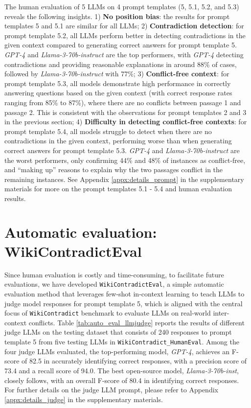 \documentclass{article}
\begin{document}
The human evaluation of 5 LLMs on 4 prompt templates (5, 5.1, 5.2, and 5.3) reveals the following insights. 
1) \textbf{No position bias}: the results for prompt templates 5 and 5.1 are similar for all LLMs;
2) \textbf{Contradiction detection}: for prompt template 5.2, all LLMs perform better in detecting contradictions in the given context compared to generating correct answers for prompt template 5. \emph{GPT-4} and \emph{Llama-3-70b-instruct} are the top performers, with \emph{GPT-4} detecting contradictions and providing reasonable explanations in around 88\% of cases, followed by \emph{Llama-3-70b-instruct} with 77\%;
3) \textbf{Conflict-free context}: for prompt template 5.3, all models demonstrate high performance in correctly answering questions based on the given context (with correct response rates ranging from 85\% to 87\%), where there are no conflicts between passage 1 and passage 2. This is consistent with the observations for prompt templates 2 and 3 in the previous section;
4) \textbf{Difficulty in detecting conflict-free contexts}: for prompt template 5.4, all models struggle to detect when there are no contradictions in the given context, performing worse than when generating correct answers for prompt template 5.3. \emph{GPT-4} and \emph{Llama-3-70b-instruct} are the worst performers, only confirming 44\% and 48\% of instances as conflict-free, and ``making up'' reasons to explain why the two passages conflict in the remaining instances. See Appendix \ref{appx:details_prompt} in the supplementary materials for more on the prompt templates 5.1 - 5.4 and human evaluation results.








\section{Automatic evaluation: WikiContradictEval}
\label{sec:auto_eval}

Since human evaluation is costly and time-consuming, to facilitate future evaluations, we have developed \texttt{WikiContradictEval}, a simple automatic evaluation method that leverages few-shot in-context learning to teach LLMs to judge model responses for prompt template 5, which is aligned with the central focus of \texttt{WikiContradict} benchmark to evaluate LLMs on real-world inter-context conflicts. Table \ref{tab:auto_eval_llmjudge} reports the results of different judge LLMs on the testing dataset that consists of 240 responses to prompt template 5 from five testing LLMs in \texttt{WikiContradict\_HumanEval}. Among the four judge LLMs evaluated, the top-performing model, \emph{GPT-4}, achieves an F-score of 82.5 in accurately identifying correct responses, with a precision score of 73.4 and a recall score of 94.0. The best open-source model, \emph{Llama-3-70b-inst}, closely follows, with an overall F-score of 80.4 in identifying correct responses. For further details on the judge LLM prompt, please refer to Appendix \ref{appx:details_judge} in the supplementary materials.
\end{document}

